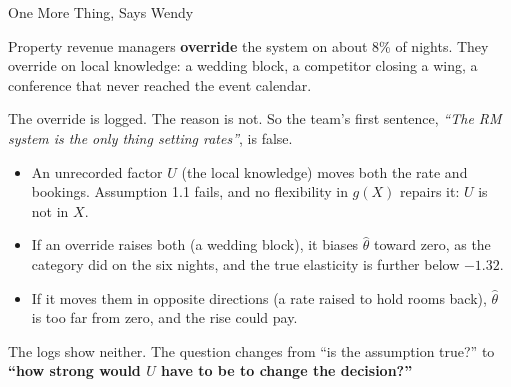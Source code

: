 \documentclass[aspectratio=169, 11pt, handout]{beamer}
\begin{document}
\begin{frame}{One More Thing, Says Wendy}

Property revenue managers \textbf{override} the system on about 8\% of nights. They override on local knowledge: a wedding block, a competitor closing a wing, a conference that never reached the event calendar.

The override is logged. \textcolor{warnred}{The reason is not.} So the team's first sentence, \emph{``The RM system is the only thing setting rates''}, is \textcolor{warnred}{false}.

\medskip

\begin{itemize}
  \item An unrecorded factor $U$ (the local knowledge) moves both the rate and bookings. Assumption 1.1 fails, and no flexibility in $g(X)$ repairs it: $U$ is not in $X$.
  \item If an override raises both (a wedding block), it biases $\hat\theta$ toward zero, as the category did on the six nights, and the true elasticity is further below $-1.32$.
  \item If it moves them in opposite directions (a rate raised to hold rooms back), $\hat\theta$ is too far from zero, and the rise could pay.
\end{itemize}

\medskip

The logs show neither. The question changes from ``is the assumption true?'' to \textbf{``how strong would $U$ have to be to change the decision?''}
\end{frame}
\end{document}
